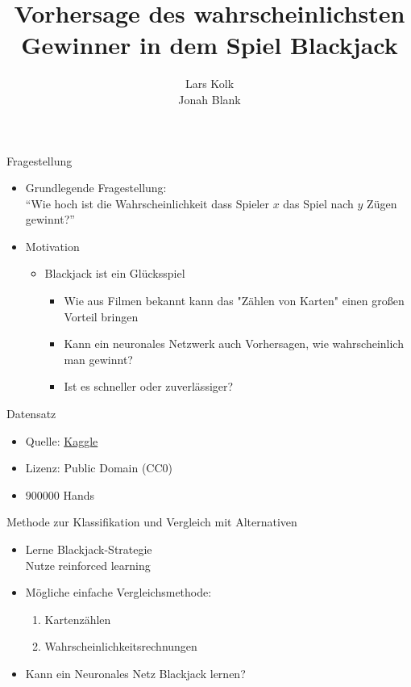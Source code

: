 \documentclass[aspectratio=1610, 9pt]{beamer}
\title{Vorhersage des wahrscheinlichsten Gewinner in dem Spiel Blackjack}
\author[L.~Kolk,~J.~Blank]{Lars Kolk\\ Jonah Blank}
\institute[ML-Seminar]{\\[0.3cm]TU Dortmund \\ \Large ML-Seminar}
\begin{document}
\maketitle


\begin{frame}{Fragestellung}
\begin{itemize}
  \item Grundlegende Fragestellung:\\
  \rightarrow{} ``Wie hoch ist die Wahrscheinlichkeit dass Spieler $x$ das Spiel nach $y$ Zügen gewinnt?''
  \vspace{0.5cm}
  \item Motivation
  \begin{itemize}
    \item Blackjack ist ein Glücksspiel
    \begin{itemize}
      \item Wie aus Filmen bekannt kann das "Zählen von Karten" einen großen Vorteil bringen
      \item Kann ein neuronales Netzwerk auch Vorhersagen, wie wahrscheinlich man gewinnt?
      \item Ist es schneller oder zuverlässiger?
    \end{itemize}
  \end{itemize}
\end{itemize}
\end{frame}


\begin{frame}{Datensatz}
    \begin{itemize}
    \item Quelle: \href{https://www.kaggle.com/mojocolors/900000-hands-of-blackjack-results}{Kaggle}
    \item Lizenz: Public Domain (CC0)
    \item $900000$ Hands
    \end{itemize}
\end{frame}

\begin{frame}{Methode zur Klassifikation und Vergleich mit Alternativen}
  \begin{itemize}
    \item Lerne Blackjack-Strategie \\
    \rightarrow{} Nutze reinforced learning\\
    \item Mögliche einfache Vergleichsmethode:
    \begin{enumerate}
      \item Kartenzählen
      \item Wahrscheinlichkeitsrechnungen
    \end{enumerate}
    \item Kann ein Neuronales Netz Blackjack lernen?
  \end{itemize}
\end{frame}
\end{document}
